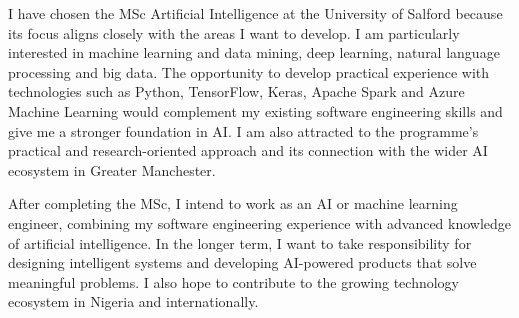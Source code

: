 \documentclass[11pt,a4paper]{article}
\begin{document}
I have chosen the MSc Artificial Intelligence at the University of Salford because its focus aligns closely with the areas I want to develop. I am particularly interested in machine learning and data mining, deep learning, natural language processing and big data. The opportunity to develop practical experience with technologies such as Python, TensorFlow, Keras, Apache Spark and Azure Machine Learning would complement my existing software engineering skills and give me a stronger foundation in AI. I am also attracted to the programme's practical and research-oriented approach and its connection with the wider AI ecosystem in Greater Manchester.

After completing the MSc, I intend to work as an AI or machine learning engineer, combining my software engineering experience with advanced knowledge of artificial intelligence. In the longer term, I want to take responsibility for designing intelligent systems and developing AI-powered products that solve meaningful problems. I also hope to contribute to the growing technology ecosystem in Nigeria and internationally.
\end{document}
